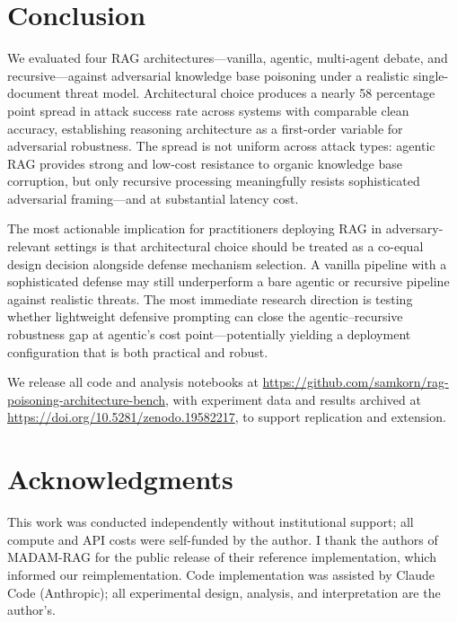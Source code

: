 \documentclass[11pt]{article}
\begin{document}
\section{Conclusion}
\label{sec:conclusion}

We evaluated four RAG architectures---vanilla, agentic, multi-agent debate, and recursive---against adversarial knowledge base poisoning under a realistic single-document threat model. Architectural choice produces a nearly 58 percentage point spread in attack success rate across systems with comparable clean accuracy, establishing reasoning architecture as a first-order variable for adversarial robustness. The spread is not uniform across attack types: agentic RAG provides strong and low-cost resistance to organic knowledge base corruption, but only recursive processing meaningfully resists sophisticated adversarial framing---and at substantial latency cost.

The most actionable implication for practitioners deploying RAG in adversary-relevant settings is that architectural choice should be treated as a co-equal design decision alongside defense mechanism selection. A vanilla pipeline with a sophisticated defense may still underperform a bare agentic or recursive pipeline against realistic threats. The most immediate research direction is testing whether lightweight defensive prompting can close the agentic--recursive robustness gap at agentic's cost point---potentially yielding a deployment configuration that is both practical and robust.

We release all code and analysis notebooks at \url{https://github.com/samkorn/rag-poisoning-architecture-bench}, with experiment data and results archived at \url{https://doi.org/10.5281/zenodo.19582217}, to support replication and extension.


\section*{Acknowledgments}

This work was conducted independently without institutional support; all compute and API costs were self-funded by the author. I thank the authors of MADAM-RAG \citep{wang2025madamrag} for the public release of their reference implementation, which informed our reimplementation. Code implementation was assisted by Claude Code (Anthropic); all experimental design, analysis, and interpretation are the author's.
\end{document}
